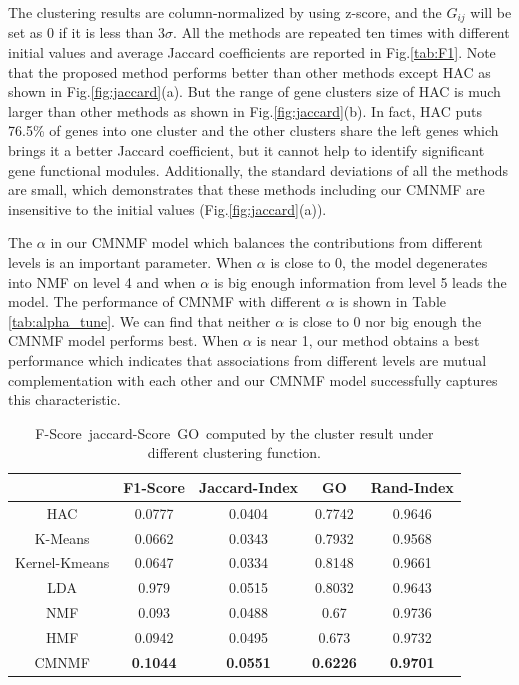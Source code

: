 \documentclass{bmcart}
\begin{document}
The clustering results are column-normalized by using z-score, and the $G_{ij}$ will be set as 0 if it is less than $3\sigma$. All the methods are repeated ten times with different initial values and average Jaccard coefficients are reported in Fig.\ref{tab:F1}. Note that the proposed method performs better than other methods except HAC as shown in Fig.\ref{fig:jaccard}(a). But the range of gene clusters size of HAC is much larger than other methods as shown in Fig.\ref{fig:jaccard}(b). In fact, HAC puts 76.5\% of genes into one cluster and the other clusters share the left genes which brings it a better Jaccard coefficient, but it cannot help to identify significant gene functional modules. Additionally, the standard deviations of all the methods are small, which demonstrates that these methods including our CMNMF are insensitive to the initial values (Fig.\ref{fig:jaccard}(a)).

The $\alpha$ in our CMNMF model which balances the contributions from different levels is an important parameter. When $\alpha$ is close to 0, the model degenerates into NMF on level 4 and when $\alpha$ is big enough information from level 5 leads the model. The performance of CMNMF with different $\alpha$ is shown in Table \ref{tab:alpha_tune}. We can find that neither $\alpha$ is close to 0 nor big enough the CMNMF model performs best. When $\alpha$ is near 1, our method obtains a best performance which indicates that associations from different levels are mutual complementation with each other and our CMNMF model successfully captures this characteristic.

\begin{table}[!t]\label{tab:F1}
\centering
\caption{F-Score\ jaccard-Score\ GO\ computed by the cluster result under different clustering function.}
\label{tab:go}
\begin{tabular}{|c||c|c|c|c|}
\hline
&F1-Score &Jaccard-Index& GO&Rand-Index\\
\hline
\hline
HAC&0.0777&0.0404&0.7742&0.9646\\
\hline
K-Means&0.0662  & 0.0343& 0.7932&0.9568\\
\hline
Kernel-Kmeans&0.0647&0.0334&0.8148&0.9661\\
\hline
LDA&0.979&0.0515&0.8032&0.9643\\
\hline
NMF&0.093&0.0488&0.67&0.9736\\
\hline
HMF&0.0942&0.0495&0.673&0.9732\\
\hline
CMNMF&\textbf{0.1044}& \textbf{0.0551}& \textbf{0.6226}&\textbf{0.9701}\\
\hline
\end{tabular}
\end{table}
\end{document}
